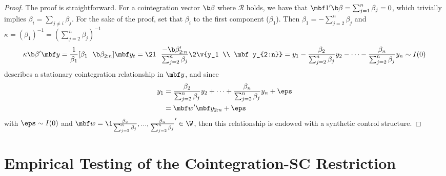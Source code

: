 \begin{proof}
The proof is straightforward. For a cointegration vector $\b \beta$ where $\mathcal R$ holds, we have that $\mbf 1'\b \beta = \sum_{j=1}^n \beta_j= 0$, which trivially implies $\beta_i = \sum_{j\neq i}\beta _j$. For the sake of the proof, set that $\beta_i$ to the first component ($\beta_1$). Then
$\beta_1 = -\sum_{j=2}^n \beta_j$ and $\kappa = (\beta_1)^{-1} = (\sum_{j=2}^n \beta_j)^{-1}$
$$
\kappa \b \beta' \mbf y 
= 
\frac{1}{\beta_1} [\beta_1 ~~ \b \beta_{2:n}] \mbf y_t 
=
\2{1 ~~ \frac{-\b \beta'_{2:n}}{\sum_{j=2}^n\beta_j}}
\2{\v{y_1 \\ \mbf y_{2:n}}}
=
y_1 - \frac{\beta_2}{\sum_{j=2}^n \beta_j}y_2 - \cdots - 
\frac{\beta_n}{\sum_{j=2}^n \beta_j} y_n
\sim I(0)
$$
describes a stationary cointegration relationship in $\mbf y$, and since
\begin{align*}
y_1 
&= \frac{\beta_2}{\sum_{j=2}^n \beta_j}y_2 + \cdots + 
\frac{\beta_n}{\sum_{j=2}^n \beta_j} y_n + \eps 
\\&= \mbf w' \mbf y_{2:n} + \eps 
\end{align*}
with $\eps\sim I(0)$ and $\mbf w=\1{\frac{\beta_2}{\sum_{j=2}^n \beta_j}, ..., \frac{\beta_n}{\sum_{j=2}^n \beta_j}}'\in \W$, then this relationship is endowed with a synthetic control structure.
\end{proof}

%

\section{Empirical Testing of the Cointegration-SC Restriction}

